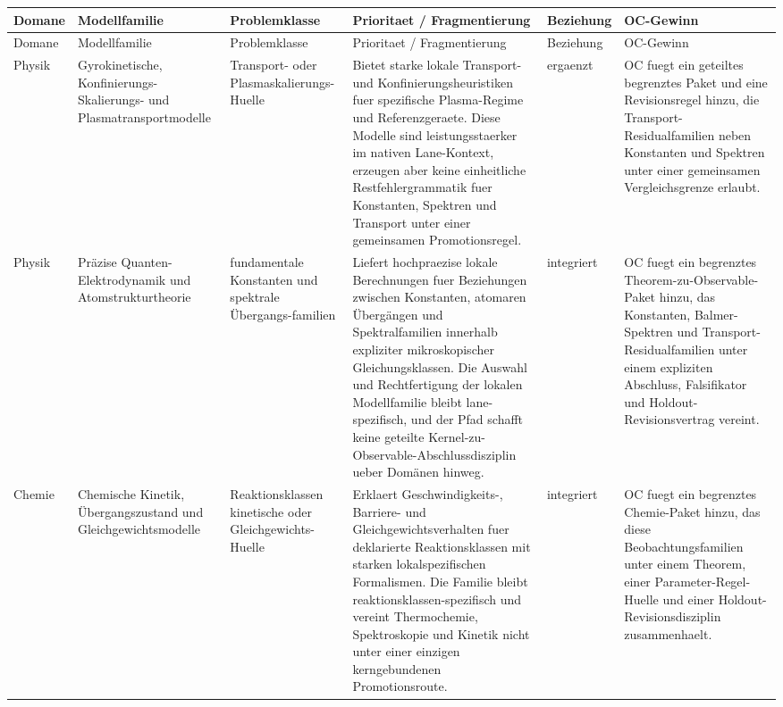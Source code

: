 \begin{longtable}{@{}L{0.09\textwidth}L{0.14\textwidth}L{0.12\textwidth}L{0.23\textwidth}L{0.12\textwidth}L{0.22\textwidth}@{}}
\toprule
Domane & Modellfamilie & Problemklasse & Prioritaet / Fragmentierung & Beziehung & OC-Gewinn \\
\midrule
\endfirsthead
\toprule
Domane & Modellfamilie & Problemklasse & Prioritaet / Fragmentierung & Beziehung & OC-Gewinn \\
\midrule
\endhead
Physik & Gyrokinetische, Konfinierungs-Skalierungs- und Plasmatransportmodelle & Transport- oder Plasmaskalierungs-Huelle & Bietet starke lokale Transport- und Konfinierungsheuristiken fuer spezifische Plasma-Regime und Referenzgeraete. \allowbreak Diese Modelle sind leistungsstaerker im nativen Lane-Kontext, erzeugen aber keine einheitliche Restfehlergrammatik fuer Konstanten, Spektren und Transport unter einer gemeinsamen Promotionsregel. & ergaenzt & OC fuegt ein geteiltes begrenztes Paket und eine Revisionsregel hinzu, die Transport-Residualfamilien neben Konstanten und Spektren unter einer gemeinsamen Vergleichsgrenze erlaubt. \\
Physik & Präzise Quanten-Elektrodynamik und Atomstrukturtheorie & fundamentale Konstanten und spektrale Übergangs-familien & Liefert hochpraezise lokale Berechnungen fuer Beziehungen zwischen Konstanten, atomaren Übergängen und Spektralfamilien innerhalb expliziter mikroskopischer Gleichungsklassen. \allowbreak Die Auswahl und Rechtfertigung der lokalen Modellfamilie bleibt lane-spezifisch, und der Pfad schafft keine geteilte Kernel-zu-Observable-Abschlussdisziplin ueber Domänen hinweg. & integriert & OC fuegt ein begrenztes Theorem-zu-Observable-Paket hinzu, das Konstanten, Balmer-Spektren und Transport-Residualfamilien unter einem expliziten Abschluss, Falsifikator und Holdout-Revisionsvertrag vereint. \\
Chemie & Chemische Kinetik, Übergangszustand und Gleichgewichtsmodelle & Reaktionsklassen kinetische oder Gleichgewichts-Huelle & Erklaert Geschwindigkeits-, Barriere- und Gleichgewichtsverhalten fuer deklarierte Reaktionsklassen mit starken lokalspezifischen Formalismen. \allowbreak Die Familie bleibt reaktionsklassen-spezifisch und vereint Thermochemie, Spektroskopie und Kinetik nicht unter einer einzigen kerngebundenen Promotionsroute. & integriert & OC fuegt ein begrenztes Chemie-Paket hinzu, das diese Beobachtungsfamilien unter einem Theorem, einer Parameter-Regel-Huelle und einer Holdout-Revisionsdisziplin zusammenhaelt. \\

\end{longtable}
